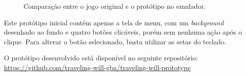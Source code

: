 \begin{figure}%
    \centering
    \qquad
    \caption{Comparação entre o jogo original e o protótipo no emulador.}%
    \label{fig:prototipo}%
\end{figure}

Este protótipo inicial contém apenas a tela de menu, com um \textit{background} desenhado ao fundo e quatro botões clicáveis, porém sem nenhuma ação após o clique. Para alterar o botão selecionado, basta utilizar as setas do teclado.

O protótipo desenvolvido está disponível no seguinte repositório: \url{https://github.com/traveling-will-gba/traveling-will-prototype}

